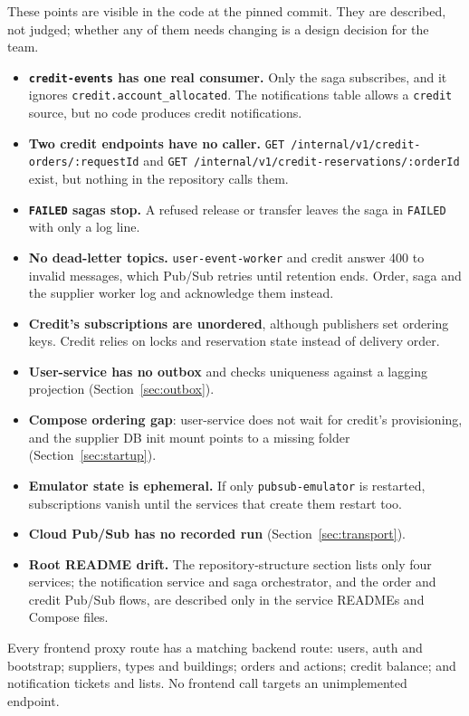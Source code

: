 \documentclass[11pt,a4paper]{article}
\newcommand{\code}[1]{\nolinkurl{#1}}
\begin{document}
These points are visible in the code at the pinned commit. They are described, not
judged; whether any of them needs changing is a design decision for the team.

\begin{itemize}
  \item \textbf{\code{credit-events} has one real consumer.} Only the saga subscribes,
  and it ignores \code{credit.account_allocated}. The notifications table allows a
  \code{credit} source, but no code produces credit notifications.
  \item \textbf{Two credit endpoints have no caller.}
  \code{GET /internal/v1/credit-orders/:requestId} and
  \code{GET /internal/v1/credit-reservations/:orderId} exist, but nothing in the
  repository calls them.
  \item \textbf{\code{FAILED} sagas stop.} A refused release or transfer leaves the
  saga in \code{FAILED} with only a log line.
  \item \textbf{No dead-letter topics.} \code{user-event-worker} and credit answer 400
  to invalid messages, which Pub/Sub retries until retention ends. Order, saga and the
  supplier worker log and acknowledge them instead.
  \item \textbf{Credit's subscriptions are unordered}, although publishers set ordering
  keys. Credit relies on locks and reservation state instead of delivery order.
  \item \textbf{User-service has no outbox} and checks uniqueness against a lagging
  projection (Section~\ref{sec:outbox}).
  \item \textbf{Compose ordering gap}: user-service does not wait for credit's
  provisioning, and the supplier DB init mount points to a missing folder
  (Section~\ref{sec:startup}).
  \item \textbf{Emulator state is ephemeral.} If only \code{pubsub-emulator} is
  restarted, subscriptions vanish until the services that create them restart too.
  \item \textbf{Cloud Pub/Sub has no recorded run} (Section~\ref{sec:transport}).
  \item \textbf{Root README drift.} The repository-structure section lists only four
  services; the notification service and saga orchestrator, and the order and credit
  Pub/Sub flows, are described only in the service READMEs and Compose files.
\end{itemize}

Every frontend proxy route has a matching backend route: users, auth and bootstrap;
suppliers, types and buildings; orders and actions; credit balance; and notification
tickets and lists. No frontend call targets an unimplemented endpoint.
\end{document}
